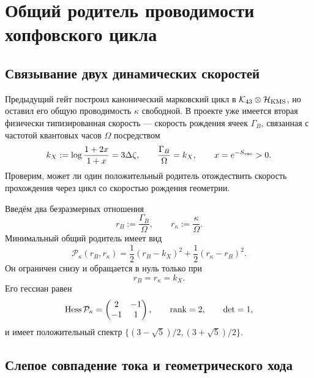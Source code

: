 \chapter{Общий родитель проводимости хопфовского цикла}
\label{ch:v10-hopf-cycle-conductance-parent}

\section{Связывание двух динамических скоростей}

Предыдущий гейт построил канонический марковский цикл в
$\mathcal K_{43}\otimes\mathcal H_{\rm KMS}$, но оставил его общую
проводимость $\kappa$ свободной. В проекте уже имеется вторая физически
типизированная скорость --- скорость рождения ячеек $\Gamma_B$, связанная с
частотой квантовых часов $\Omega$ посредством
\begin{equation}
 k_X:=\log\frac{1+2x}{1+x}=3\Delta\zeta,
 \qquad
 \frac{\Gamma_B}{\Omega}=k_X,
 \qquad x=e^{-S_{\rm vac}}>0.
 \label{eq:v10-conductance-growth-coupling}
\end{equation}
Проверим, может ли один положительный родитель отождествить скорость
прохождения через цикл со скоростью рождения геометрии.

Введём два безразмерных отношения
\begin{equation}
 r_B:=\frac{\Gamma_B}{\Omega},
 \qquad
 r_\kappa:=\frac{\kappa}{\Omega}.
\end{equation}
Минимальный общий родитель имеет вид
\begin{equation}
 \mathcal P_\kappa(r_B,r_\kappa)
 =\frac12(r_B-k_X)^2+\frac12(r_\kappa-r_B)^2.
 \label{eq:v10-conductance-common-parent}
\end{equation}
Он ограничен снизу и обращается в нуль только при
\begin{equation}
 r_B=r_\kappa=k_X.
 \label{eq:v10-conductance-selected-point}
\end{equation}
Его гессиан равен
\begin{equation}
 \operatorname{Hess}\mathcal P_\kappa
 =\begin{pmatrix}2&-1\\-1&1\end{pmatrix},
 \qquad \operatorname{rank}=2,
 \qquad \det=1,
 \label{eq:v10-conductance-parent-hessian}
\end{equation}
и имеет положительный спектр
$\{(3-\sqrt5)/2,(3+\sqrt5)/2\}$.

\section{Слепое совпадение тока и геометрического хода}

